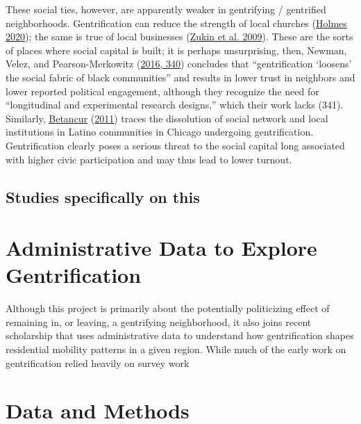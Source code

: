 \documentclass[
  12pt,
]{article}
\begin{document}
These social ties, however, are apparently weaker in gentrifying / gentrified neighborhoods. Gentrification can reduce the strength of local churches (\protect\hyperlink{ref-Holmes2020}{Holmes 2020}); the same is true of local businesses (\protect\hyperlink{ref-Zukin2009}{Zukin et al. 2009}). These are the sorts of places where social capital is built; it is perhaps unsurprising, then, Newman, Velez, and Pearson-Merkowitz (\protect\hyperlink{ref-Newman2016}{2016, 340}) concludes that ``gentrification `loosens' the social fabric of black communities'' and results in lower trust in neighbors and lower reported political engagement, although they recognize the need for ``longitudinal and experimental research designs,'' which their work lacks (341). Similarly, \protect\hyperlink{ref-Betancur2011}{Betancur} (\protect\hyperlink{ref-Betancur2011}{2011}) traces the dissolution of social network and local institutions in Latino communities in Chicago undergoing gentrification. Gentrification clearly poses a serious threat to the social capital long associated with higher civic participation and may thus lead to lower turnout.

\hypertarget{studies-specifically-on-this}{%
\subsection*{Studies specifically on this}\label{studies-specifically-on-this}}

\hypertarget{administrative-data-to-explore-gentrification}{%
\section*{Administrative Data to Explore Gentrification}\label{administrative-data-to-explore-gentrification}}

Although this project is primarily about the potentially politicizing effect of remaining in, or leaving, a gentrifying neighborhood, it also joins recent scholarship that uses administrative data to understand how gentrification shapes residential mobility patterns in a given region. While much of the early work on gentrification relied heavily on survey work

\hypertarget{data-and-methods}{%
\section*{Data and Methods}\label{data-and-methods}}
\end{document}
